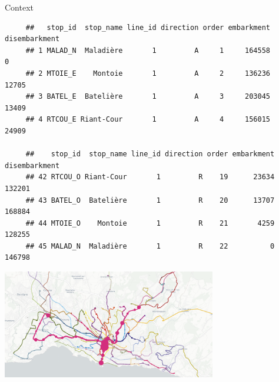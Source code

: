 \documentclass[10pt]{beamer}
\begin{document}
	\begin{frame}[fragile]{Context}
	\scriptsize
\begin{center}
\begin{verbatim}
     ##   stop_id  stop_name line_id direction order embarkment disembarkment
     ## 1 MALAD_N  Maladière       1         A     1     164558             0
     ## 2 MTOIE_E    Montoie       1         A     2     136236         12705
     ## 3 BATEL_E  Batelière       1         A     3     203045         13409
     ## 4 RTCOU_E Riant-Cour       1         A     4     156015         24909
      
     ##    stop_id  stop_name line_id direction order embarkment disembarkment
     ## 42 RTCOU_O Riant-Cour       1         R    19      23634        132201
     ## 43 BATEL_O  Batelière       1         R    20      13707        168884
     ## 44 MTOIE_O    Montoie       1         R    21       4259        128255
     ## 45 MALAD_N  Maladière       1         R    22          0        146798
\end{verbatim}

\includegraphics[width=0.7\textwidth]{img/tl_network.png}
\end{center}
	\end{frame}
	
	
\end{document}

